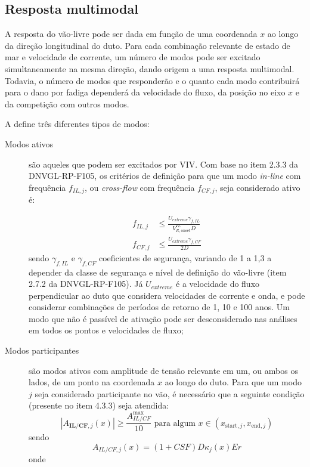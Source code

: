 \subsection{Resposta multimodal}\label{sec:multimode}


A resposta do vão-livre pode ser dada em função de uma coordenada $x$ ao longo da direção longitudinal do duto.
Para cada combinação relevante de estado de mar e velocidade de corrente, um número de modos pode ser excitado simultaneamente na mesma direção, dando origem a uma resposta multimodal.
Todavia, o número de modos que responderão e o quanto cada modo contribuirá para o dano por fadiga dependerá da velocidade do fluxo, da posição no eixo $x$ e da competição com outros modos.

A  define três diferentes tipos de modos:
\begin{description}
	\item[Modos ativos] são aqueles que podem ser excitados por VIV\@. Com base no item 2.3.3 da DNVGL-RP-F105, os critérios de definição para que um modo \textit{in-line} com frequência $f_{IL,j}$, ou \textit{cross-flow} com frequência $f_{CF,j}$, seja considerado ativo é:

    \begin{equation}
        \begin{aligned}
        f_{I L, j} & \leq \frac{U_{extreme} \gamma_{f,IL}}{V_{R,\text{onset}}^{IL} D} \\
        f_{C F, j} & \leq \frac{U_{extreme} \gamma_{f,CF}}{2D}
        \end{aligned}
    \end{equation}
    sendo $\gamma_{f,IL}$ e $\gamma_{f,CF}$ coeficientes de segurança, variando de 1 a 1,3 a depender da classe de segurança e nível de
    definição do vão-livre (item 2.7.2 da DNVGL-RP-F105). Já $U_{extreme}$ é a velocidade do fluxo perpendicular ao duto que considera velocidades de corrente e onda, e pode considerar combinações de períodos de retorno de 1, 10 e 100 anos.
    Um modo que não é passível de ativação pode ser desconsiderado nas análises em todos os pontos e velocidades de fluxo;

    \item[Modos participantes] são modos ativos com amplitude de tensão relevante em um, ou ambos os lados, de um ponto na coordenada $x$ ao longo do duto. Para que um modo $j$ seja considerado participante no vão, é necessário que a seguinte condição (presente no item 4.3.3) seja atendida:
    \[
    \left|A_{\textbf{IL/CF}, j}(x)\right| \geq \frac{A_{IL/CF}^{\max}}{10} \text{ para algum } x \in (x_{\text{start},j}, x_{\text{end}, j})
    \]
    sendo
    \[
    A_{IL/CF, j}(x) = (1+CSF) D \kappa_{j}(x) E r
    \]
    onde


\end{description}
